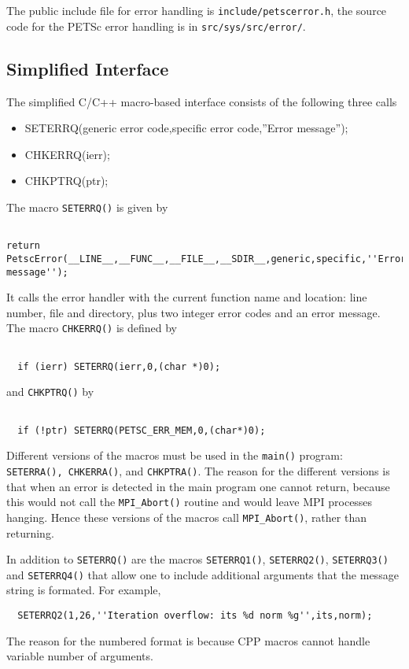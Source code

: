 \documentclass[twoside,12pt]{../sty/report_petsc}
\begin{document}
The public include file for error handling is {\tt include/petscerror.h}, the 
source code for the PETSc error handling is in  
{\tt src/sys/src/error/}.

\subsection{Simplified Interface}

The simplified C/C++ macro-based interface consists of the following three calls
\begin{itemize}
\item SETERRQ(generic error code,specific error code,''Error message'');
\item CHKERRQ(ierr);
\item CHKPTRQ(ptr);
\end{itemize}

The macro {\tt SETERRQ()} is given by 
\begin{verbatim}

return PetscError(__LINE__,__FUNC__,__FILE__,__SDIR__,generic,specific,''Error message'');

\end{verbatim}
It calls the error handler with the current function name and location: line number,
file and directory, plus two integer error codes and an error message.
The macro {\tt CHKERRQ()} is defined by
\begin{verbatim}

  if (ierr) SETERRQ(ierr,0,(char *)0);

\end{verbatim}
and {\tt CHKPTRQ()} by 
\begin{verbatim}

  if (!ptr) SETERRQ(PETSC_ERR_MEM,0,(char*)0);

\end{verbatim}

Different versions of the macros must be used in the {\tt main()} program:
{\tt SETERRA(), CHKERRA()}, and {\tt CHKPTRA()}. The reason for the different versions
is that when an error is detected in the main program one cannot return, because 
this would not call the {\tt MPI\_Abort()} routine and would leave MPI processes hanging.
Hence these versions of the macros call {\tt MPI\_Abort()}, rather than returning.

In addition to {\tt SETERRQ()} are the macros {\tt SETERRQ1()}, {\tt SETERRQ2()}, {\tt SETERRQ3()}
and {\tt SETERRQ4()} that allow one to include additional arguments that the message
string is formated. For example,
\begin{verbatim}
  SETERRQ2(1,26,''Iteration overflow: its %d norm %g'',its,norm);
\end{verbatim}
The reason for the numbered format is because CPP macros cannot handle variable number
of arguments.
 
\end{document}

